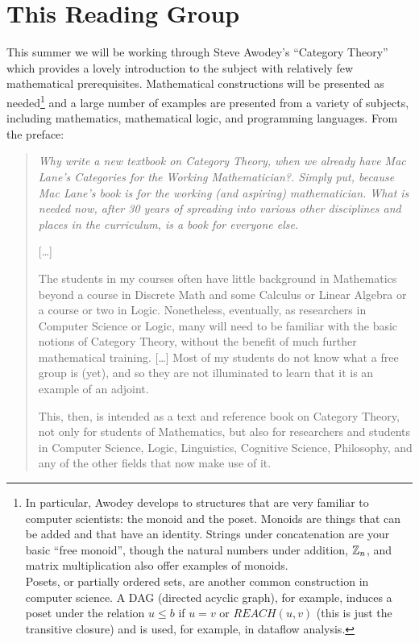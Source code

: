 \section*{This Reading Group}
This summer we will be working through Steve Awodey's ``Category Theory'' which
provides a lovely introduction to the subject with relatively few mathematical
prerequisites. Mathematical constructions will be presented as
needed\footnote{In particular, Awodey develops to structures that are very
familiar to computer scientists: the monoid and the poset. Monoids are things
that can be added and that have an identity. Strings under concatenation are
your basic ``free monoid'', though the natural numbers under addition, \(\mathbb Z_n\),
and matrix multiplication also offer examples of monoids.\\

Posets, or partially ordered sets, are another common construction in computer
science. A DAG (directed acyclic graph), for example, induces a poset under the
relation \(u \leq b\) if \(u = v\) or \(REACH(u,v)\) (this is just the
transitive closure) and is used, for example, in dataflow analysis.} and a large
number of examples are presented from a variety of subjects, including
mathematics, mathematical logic, and programming languages. From the preface:

\begin{quote}
    {\it Why write a new textbook on Category Theory, when we already have Mac
    Lane's \textnormal{Categories for the Working Mathematician?}. Simply put,
    because Mac Lane's book is for the working (and aspiring) mathematician.
    What is needed now, after 30 years of spreading into various other
    disciplines and places in the curriculum, is a book for everyone else.

    [\ldots]

    The students in my courses often have little background in Mathematics
    beyond a course in Discrete Math and some Calculus or Linear Algebra or a
    course or two in Logic. Nonetheless, eventually, as researchers in Computer
    Science or Logic, many will need to be familiar with the basic notions of
    Category Theory, without the benefit of much further mathematical
    training. [\ldots] Most of my students do not know what a free group is
    (yet), and so they are not illuminated to learn that it is an example of an
    adjoint.

    This, then, is intended as a text and reference book on Category Theory, not
    only for students of Mathematics, but also for researchers and students in
    Computer Science, Logic, Linguistics, Cognitive Science, Philosophy, and any
    of the other fields that now make use of it.}
\end{quote}

